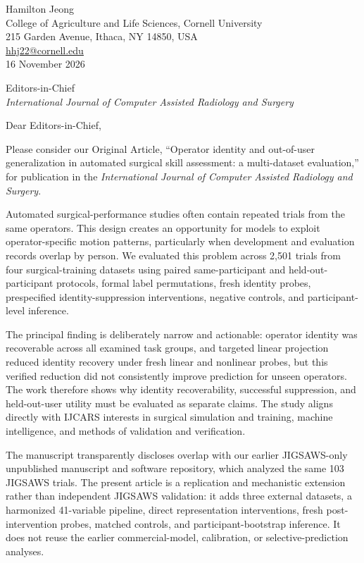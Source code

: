 \documentclass[10pt]{article}
\begin{document}
\begin{flushright}
Hamilton Jeong\\
College of Agriculture and Life Sciences, Cornell University\\
215 Garden Avenue, Ithaca, NY 14850, USA\\
\href{mailto:hhj22@cornell.edu}{hhj22@cornell.edu}\\
16 November 2026
\end{flushright}

Editors-in-Chief\\
\emph{International Journal of Computer Assisted Radiology and Surgery}

Dear Editors-in-Chief,

Please consider our Original Article, ``Operator identity and out-of-user generalization in automated surgical skill assessment: a multi-dataset evaluation,'' for publication in the \emph{International Journal of Computer Assisted Radiology and Surgery}.

Automated surgical-performance studies often contain repeated trials from the same operators. This design creates an opportunity for models to exploit operator-specific motion patterns, particularly when development and evaluation records overlap by person. We evaluated this problem across 2,501 trials from four surgical-training datasets using paired same-participant and held-out-participant protocols, formal label permutations, fresh identity probes, prespecified identity-suppression interventions, negative controls, and participant-level inference.

The principal finding is deliberately narrow and actionable: operator identity was recoverable across all examined task groups, and targeted linear projection reduced identity recovery under fresh linear and nonlinear probes, but this verified reduction did not consistently improve prediction for unseen operators. The work therefore shows why identity recoverability, successful suppression, and held-out-user utility must be evaluated as separate claims. The study aligns directly with IJCARS interests in surgical simulation and training, machine intelligence, and methods of validation and verification.

The manuscript transparently discloses overlap with our earlier JIGSAWS-only unpublished manuscript and software repository, which analyzed the same 103 JIGSAWS trials. The present article is a replication and mechanistic extension rather than independent JIGSAWS validation: it adds three external datasets, a harmonized 41-variable pipeline, direct representation interventions, fresh post-intervention probes, matched controls, and participant-bootstrap inference. It does not reuse the earlier commercial-model, calibration, or selective-prediction analyses.
\end{document}
